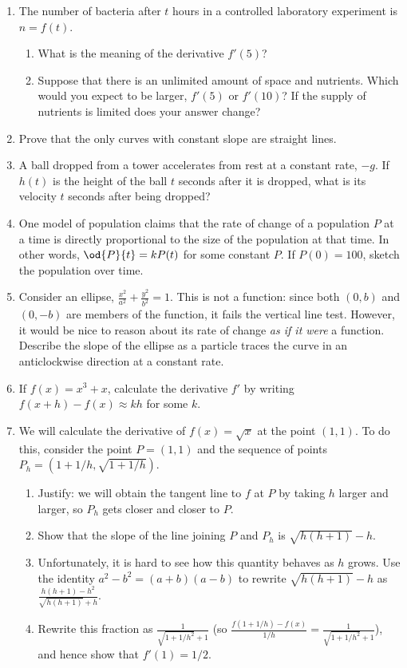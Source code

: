 \begin{enumerate}
\begin{enumerate}
    \end{enumerate}
  \item The number of bacteria after $ t $ hours in a controlled laboratory experiment is $ n = f(t) $.
    \begin{enumerate}
      \item What is the meaning of the derivative $ f'(5) $?
      \item Suppose that there is an unlimited amount of space and nutrients. Which would you
            expect to be larger, $ f'(5) $ or $ f'(10) $? If the supply of nutrients is limited
            does your answer change?
    \end{enumerate}
  \item Prove that the only curves with constant slope are straight lines.
  \item A ball dropped from a tower accelerates from rest at a constant rate, $ -g $. If $ h(t) $ is the height of the ball $ t $ seconds
        after it is dropped, what is its velocity $ t $ seconds after being dropped?
  \item One model of population claims that the rate of change of a population $ P $ at a time is directly proportional to the size of
        the population at that time. In other words, $ \od{P}{t} = kP(t) $ for some constant $ P $. If $ P(0) = 100 $, sketch
        the population over time.
  \item Consider an ellipse, $ \frac{x^2}{a^2} + \frac{y^2}{b^2} = 1 $. This is not a function: since both $ (0, b) $ and $ (0, -b) $ are
            members of the function, it fails the vertical line test. However, it would be nice to reason about its
            rate of change \textit{as if it were} a function. Describe the slope of the ellipse as a particle traces the curve in
            an anticlockwise direction at a constant rate.
  \item If $ f(x) = x^3 + x $, calculate the derivative $ f' $ by writing $ f(x + h) - f(x) \approx kh $ for some $ k $.
  \item We will calculate the derivative of $ f(x) = \sqrt{x} $ at the point $ (1,1) $. To do this,
        consider the point $ P = (1,1) $ and the sequence of points $ P_h = (1 + 1/h, \sqrt{1 + 1/h}) $.
    \begin{enumerate}
      \item Justify: we will obtain the tangent line to $ f $ at $ P $ by taking $ h $ larger and larger, so $ P_h $
            gets closer and closer to $ P $.
      \item Show that the slope of the line joining $ P $ and $ P_h $ is $ \sqrt{h(h + 1)} - h $.
      \item Unfortunately, it is hard to see how this quantity behaves as $ h $ grows. Use the identity
            $ a^2 - b^2 = (a + b)(a - b) $ to rewrite $ \sqrt{h(h + 1)} - h $ as $ \frac{h(h + 1) - h^2}{\sqrt{h(h + 1)} + h} $.
      \item Rewrite this fraction as $ \frac{1}{\sqrt{1 + 1/h^2} + 1} $ (so $ \frac{f(1 + 1/h) - f(x)}{1/h} = \frac{1}{\sqrt{1 + 1/h^2} + 1} $),
            and hence show that $ f'(1) = 1/2 $.
    \end{enumerate}
\end{enumerate}

